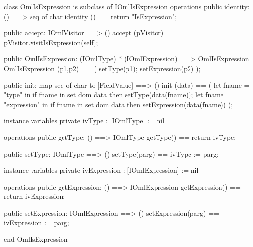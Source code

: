 \begin{vdm_al}
class OmlIsExpression is subclass of IOmlIsExpression
operations
  public identity: () ==> seq of char
  identity () == return "IsExpression";

  public accept: IOmlVisitor ==> ()
  accept (pVisitor) == pVisitor.visitIsExpression(self);

  public OmlIsExpression:
      (IOmlType) *
      (IOmlExpression) ==> OmlIsExpression
  OmlIsExpression (p1,p2) == 
   ( setType(p1);
     setExpression(p2) );

  public init: map seq of char to [FieldValue] ==> ()
  init (data) ==
    ( let fname = "type" in
        if fname in set dom data
        then setType(data(fname));
      let fname = "expression" in
        if fname in set dom data
        then setExpression(data(fname)) );

instance variables
  private ivType : [IOmlType] := nil

operations
  public getType: () ==> IOmlType
  getType() == return ivType;

  public setType: IOmlType ==> ()
  setType(parg) == ivType := parg;

instance variables
  private ivExpression : [IOmlExpression] := nil

operations
  public getExpression: () ==> IOmlExpression
  getExpression() == return ivExpression;

  public setExpression: IOmlExpression ==> ()
  setExpression(parg) == ivExpression := parg;

end OmlIsExpression
\end{vdm_al}


